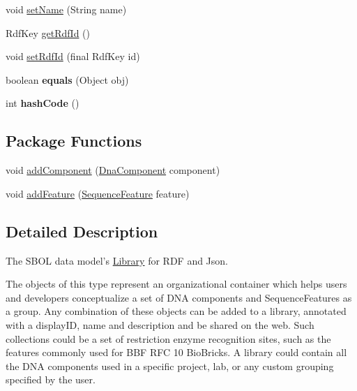 \begin{DoxyCompactItemize}
void \hyperlink{classorg_1_1sbolstandard_1_1lib_s_b_o_lj_1_1_library_ac7bf604c035c0cab532f607f577a98a5}{setName} (String name)
\item 
RdfKey \hyperlink{classorg_1_1sbolstandard_1_1lib_s_b_o_lj_1_1_library_aa3e7c278322093a0d6111ce4dd5bf00c}{getRdfId} ()
\item 
void \hyperlink{classorg_1_1sbolstandard_1_1lib_s_b_o_lj_1_1_library_a976b7f61221586e9ee73f6fc331bf3ea}{setRdfId} (final RdfKey id)
\item 
\hypertarget{classorg_1_1sbolstandard_1_1lib_s_b_o_lj_1_1_library_acd76902489e9ba6c1e6862ec1619f450}{
boolean {\bfseries equals} (Object obj)}
\label{classorg_1_1sbolstandard_1_1lib_s_b_o_lj_1_1_library_acd76902489e9ba6c1e6862ec1619f450}

\item 
\hypertarget{classorg_1_1sbolstandard_1_1lib_s_b_o_lj_1_1_library_a7204b7246e94a26588fd68da3b728121}{
int {\bfseries hashCode} ()}
\label{classorg_1_1sbolstandard_1_1lib_s_b_o_lj_1_1_library_a7204b7246e94a26588fd68da3b728121}

\end{DoxyCompactItemize}
\subsection*{Package Functions}
\begin{DoxyCompactItemize}
\item 
void \hyperlink{classorg_1_1sbolstandard_1_1lib_s_b_o_lj_1_1_library_aad38ada3f43e55f64bade0a0f0af46b2}{addComponent} (\hyperlink{classorg_1_1sbolstandard_1_1lib_s_b_o_lj_1_1_dna_component}{DnaComponent} component)
\item 
void \hyperlink{classorg_1_1sbolstandard_1_1lib_s_b_o_lj_1_1_library_a4fe0e7845bfea40035fae805e56bbc8d}{addFeature} (\hyperlink{classorg_1_1sbolstandard_1_1lib_s_b_o_lj_1_1_sequence_feature}{SequenceFeature} feature)
\end{DoxyCompactItemize}


\subsection{Detailed Description}
The SBOL data model's \hyperlink{classorg_1_1sbolstandard_1_1lib_s_b_o_lj_1_1_library}{Library} for RDF and Json.

The objects of this type represent an organizational container which helps users and developers conceptualize a set of DNA components and SequenceFeatures as a group. Any combination of these objects can be added to a library, annotated with a displayID, name and description and be shared on the web. Such collections could be a set of restriction enzyme recognition sites, such as the features commonly used for BBF RFC 10 BioBricks. A library could contain all the DNA components used in a specific project, lab, or any custom grouping specified by the user.

